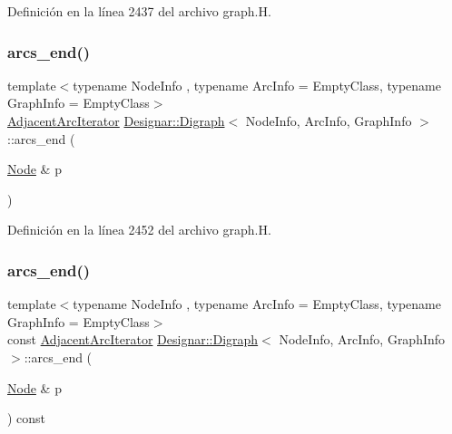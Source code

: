 Definición en la línea 2437 del archivo graph.\+H.

\mbox{\label{class_designar_1_1_digraph_ab7e47c93dd15bab0510977f403a35849}} 
\subsubsection{\texorpdfstring{arcs\+\_\+end()}{arcs\_end()}\hspace{0.1cm}{\footnotesize\ttfamily [3/4]}}
{\footnotesize\ttfamily template$<$typename Node\+Info , typename Arc\+Info  = Empty\+Class, typename Graph\+Info  = Empty\+Class$>$ \\
\hyperlink{class_designar_1_1_digraph_1_1_adjacent_arc_iterator}{Adjacent\+Arc\+Iterator} \hyperlink{class_designar_1_1_digraph}{Designar\+::\+Digraph}$<$ Node\+Info, Arc\+Info, Graph\+Info $>$\+::arcs\+\_\+end (\begin{DoxyParamCaption}\item[{\hyperlink{class_designar_1_1_digraph_a4dc921c41a480b7946a04170e997d8ae}{Node} \&}]{p }\end{DoxyParamCaption})\hspace{0.3cm}{\ttfamily [inline]}}



Definición en la línea 2452 del archivo graph.\+H.

\mbox{\label{class_designar_1_1_digraph_a68abe34d6f5a7b429715ec55aa030b7d}} 
\subsubsection{\texorpdfstring{arcs\+\_\+end()}{arcs\_end()}\hspace{0.1cm}{\footnotesize\ttfamily [4/4]}}
{\footnotesize\ttfamily template$<$typename Node\+Info , typename Arc\+Info  = Empty\+Class, typename Graph\+Info  = Empty\+Class$>$ \\
const \hyperlink{class_designar_1_1_digraph_1_1_adjacent_arc_iterator}{Adjacent\+Arc\+Iterator} \hyperlink{class_designar_1_1_digraph}{Designar\+::\+Digraph}$<$ Node\+Info, Arc\+Info, Graph\+Info $>$\+::arcs\+\_\+end (\begin{DoxyParamCaption}\item[{\hyperlink{class_designar_1_1_digraph_a4dc921c41a480b7946a04170e997d8ae}{Node} \&}]{p }\end{DoxyParamCaption}) const\hspace{0.3cm}{\ttfamily [inline]}}



